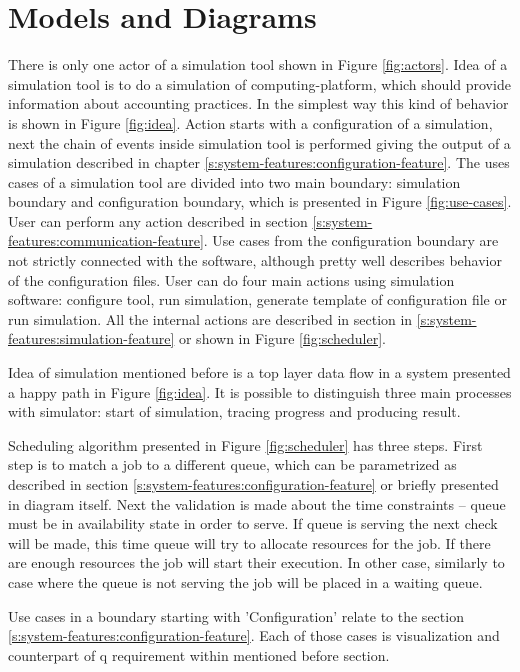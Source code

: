 \chapter{Models and Diagrams} \label{chp:models-and-diagrams}
	There is only one actor of a simulation tool shown in Figure \ref{fig:actors}. Idea of a simulation tool is to do a simulation of \gls{computing-platform}, which should provide information about accounting practices. In the simplest way this kind of behavior is shown in Figure \ref{fig:idea}. Action starts with a configuration of a simulation, next the chain of events inside simulation tool is performed giving the output of a simulation described in chapter \ref{s:system-features:configuration-feature}. The uses cases of a simulation tool are divided into two main boundary: simulation boundary and configuration boundary, which is presented in Figure \ref{fig:use-cases}. User can perform any action described in section \ref{s:system-features:communication-feature}. Use cases from the configuration boundary are not strictly connected with the software, although pretty well describes behavior of the configuration files. User can do four main actions using simulation software: configure tool, run simulation, generate template of configuration file or run simulation. All the internal actions are described in section in \ref{s:system-features:simulation-feature} or shown in Figure \ref{fig:scheduler}.
	
	Idea of simulation mentioned before is a top layer data flow in a system presented a happy path in Figure \ref{fig:idea}. It is possible to distinguish three main processes with simulator: start of simulation, tracing progress and producing result.
	
	Scheduling algorithm presented in Figure \ref{fig:scheduler} has three steps. First step is to match a job to a different queue, which can be parametrized as described in section \ref{s:system-features:configuration-feature} or briefly presented in diagram itself. Next the validation is made about the time constraints -- queue must be in availability state in order to serve. If queue is serving the next check will be made, this time queue will try to allocate resources for the job. If there are enough resources the job will start their execution. In other case, similarly to case where the queue is not serving the job will be placed in a waiting queue.
	
	Use cases in a boundary starting with 'Configuration' relate to the section \ref{s:system-features:configuration-feature}. Each of those cases is visualization and counterpart of q requirement within mentioned before section.